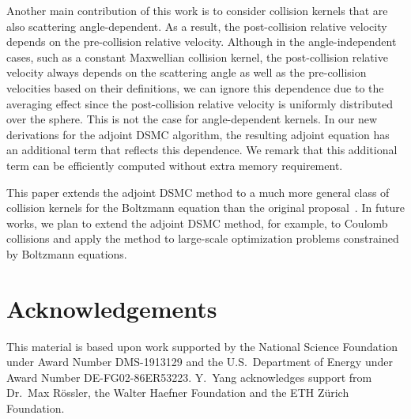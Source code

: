 \documentclass[12pt,nopreprintline]{elsarticle}
\begin{document}
Another main contribution of this work is to consider collision kernels that are also scattering angle-dependent. As a result, the post-collision relative velocity depends on the pre-collision relative velocity. Although in the angle-independent cases, such as a constant Maxwellian collision kernel, the post-collision relative velocity always depends on the scattering angle as well as the pre-collision velocities based on their definitions,  we can ignore this dependence due to the averaging effect since the post-collision relative velocity is uniformly distributed over the sphere. This is not the case for angle-dependent kernels. In our new derivations for the adjoint DSMC algorithm, the resulting adjoint equation has an additional term that reflects this dependence. We remark that this additional term can be efficiently computed without extra memory requirement. 

This paper extends the adjoint DSMC method to a much more general class of collision kernels for the Boltzmann equation than the original proposal~\cite{caflisch2021adjoint}.  In future works, we plan to extend the adjoint DSMC method, for example, to Coulomb collisions and apply the method to large-scale optimization problems constrained by Boltzmann equations.

\section*{Acknowledgements}
This material is based upon work supported by the National Science Foundation under Award Number DMS-1913129 and the U.S.~Department of Energy under Award Number DE-FG02-86ER53223. Y.~Yang acknowledges support from Dr.~Max R\"ossler, the Walter Haefner Foundation and the ETH Z\"urich Foundation.





\end{document}
